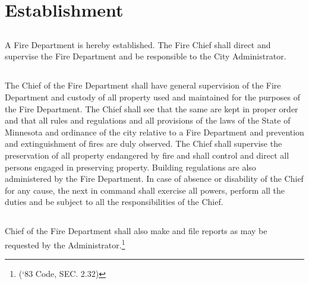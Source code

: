 \setcounter{section}{39}
\section{Establishment}
\subsection{}
A Fire Department is hereby established.  The Fire Chief shall direct and supervise the Fire Department and be responsible to the City Administrator.
\subsection{}
The Chief of the Fire Department shall have general supervision of the Fire Department and custody of all property used and maintained for the purposes of the Fire Department.  The Chief shall see that the same are kept in proper order and that all rules and regulations and all provisions of the laws of the State of Minnesota and ordinance of the city relative to a Fire Department and prevention and extinguishment of fires are duly observed.  The Chief shall supervise the preservation of all property endangered by fire and shall control and direct all persons engaged in preserving property.  Building regulations are also administered by the Fire Department. In case of absence or disability of the Chief for any cause, the next in command shall exercise all powers, perform all the duties and be subject to all the responsibilities of the Chief.
\subsection{}
Chief of the Fire Department shall also make and file reports as may be requested by the Administrator.\footnote{(‘83 Code, SEC. 2.32)}

